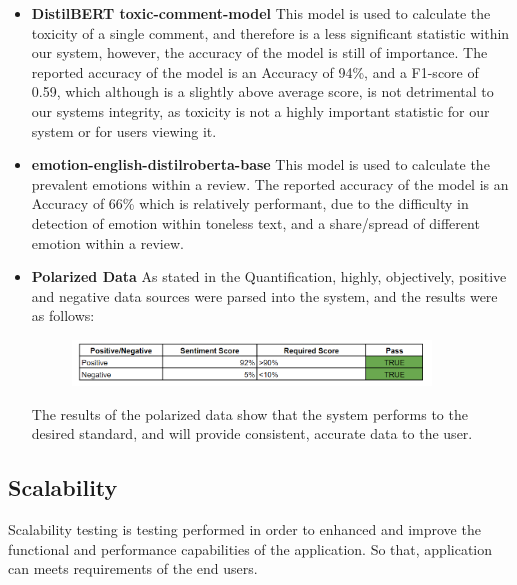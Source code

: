 \documentclass[12pt]{article}
\begin{document}
\begin{itemize}
    \item \textbf{DistilBERT toxic-comment-model} This model is used to calculate the toxicity of a single comment, and therefore is a less significant statistic within our system, however, the accuracy of the model is still of importance. The reported accuracy of the model is an Accuracy of 94\%, and a F1-score of 0.59, which although is a slightly above average score, is not detrimental to our systems integrity, as toxicity is not a highly important statistic for our system or for users viewing it.
    \item \textbf{emotion-english-distilroberta-base} This model is used to calculate the prevalent emotions within a review. The reported accuracy of the model is an Accuracy of 66\% which is relatively performant, due to the difficulty in detection of emotion within toneless text, and a share/spread of different emotion within a review.
    \item \textbf{Polarized Data} As stated in the Quantification, highly, objectively, positive and negative data sources were parsed into the system, and the results were as follows:
          \begin{figure}[H]
              \centering
              \includegraphics[width=0.9\textwidth]{PositiveAndNegative.png}
          \end{figure}
          The results of the polarized data show that the system performs to the desired standard, and will provide consistent, accurate data to the user.
\end{itemize}
\subsection{Scalability}
Scalability testing is testing performed in order to enhanced and improve the functional and performance capabilities of the application. So that, application can meets requirements of the end users.
\end{document}
